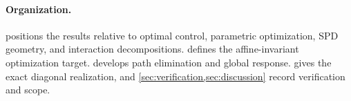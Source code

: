 \paragraph{Organization.}
 positions the results relative to optimal control,
parametric optimization, SPD geometry, and interaction decompositions.
 defines the affine-invariant optimization target.
 develops path elimination and global response.
 gives the exact diagonal realization, and
\cref{sec:verification,sec:discussion} record verification and scope.

